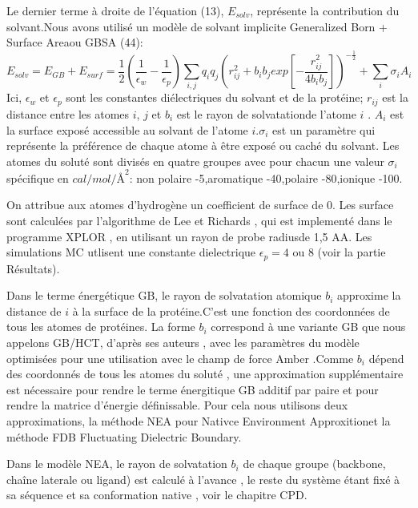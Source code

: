 Le dernier terme à droite de l'équation (13), $E_{solv}$, représente la contribution du solvant.Nous avons utilisé un modèle de solvant implicite \og Generalized Born + Surface Area\fg ou GBSA (44):
\begin{displaymath}
E_{solv} = E_{GB} + E_{surf} = \frac{1}{2}(\frac{1}{\epsilon_w} - \frac{1}{\epsilon_p})\sum_{i,j} q_iq_j (r^2_{ij} + b_ib_jexp[-\frac{r^2_{ij}}{4b_ib_j}])^{-\frac{1}{2}} + \sum_i \sigma_iA_i
\end{displaymath} 
Ici, $\epsilon_w$ et $\epsilon_p$ sont les constantes diélectriques du solvant et de la protéine; $r_{ij}$ est la distance entre les atomes $i$, $j$ et $b_i$ est le \og rayon de solvatation\fg de l'atome $i$ \cite{Hawkins95,Lopes07}. $A_i$ est la surface exposé accessible au solvant de l'atome $i$.$\sigma_i$ est un paramètre qui représente la préférence de chaque atome à être exposé ou caché du solvant. Les atomes du soluté sont divisés en quatre groupes avec pour chacun une valeur $\sigma_i$ spécifique en $cal/mol/Å^2$:
non polaire -5,aromatique -40,polaire -80,ionique -100.

On attribue aux atomes d'hydrogène un coefficient de surface de 0. Les surface sont calculées par l'algorithme de Lee et Richards \cite{Lee71},  qui est implementé dans le programme XPLOR \cite{Xplor}, en utilisant un rayon de \og probe radius\fg de 1,5 {AA}. Les simulations MC utlisent une constante dielectrique $\epsilon_p = 4$ ou $8$ (voir la partie Résultats).

Dans le terme énergétique GB, le rayon de solvatation atomique $b_i$ approxime la distance de $i$ à la surface de la protéine.C'est une fonction des coordonnées de tous les atomes de protéines. La forme $b_i$ correspond à une variante GB que nous appelons GB/HCT, d'après ses auteurs \cite{Hawkins95}, avec les paramètres du modèle optimisées pour une utilisation avec le champ de force Amber \cite{Lopes07}.Comme $b_i$ dépend des coordonnés de tous les atomes du soluté \cite{Hawkins95}, une approximation supplémentaire est nécessaire pour rendre le terme énergitique GB additif par paire et pour rendre la matrice d'énergie définissable.
Pour cela nous utilisons deux approximations, la méthode NEA pour \og Nativce Environment Approxition\fg et la méthode FDB \og Fluctuating Dielectric Boundary\fg \cite{Villa01}.

Dans le modèle NEA, le rayon de solvatation $b_i$ de chaque groupe (backbone, chaîne laterale ou ligand) est calculé à l'avance , le reste du système étant fixé à sa séquence et sa conformation native \cite{Simonson13b,Gaillard14}, voir le chapitre CPD.

